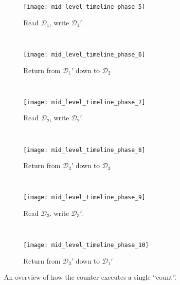 \documentclass[10pt]{article}
\begin{document}
\begin{figure}
    \centering

    \begin{subfigure}[t]{0.14\textwidth}
        \centering
        \texttt{[image: mid\_level\_timeline\_phase\_5]}
        \caption{\label{fig:mid_level_timeline_phase_5} Read ${\mathcal{D}_1}$, write ${\mathcal{D}_1}'$.}
    \end{subfigure} %
    ~
    \begin{subfigure}[t]{0.14\textwidth}
        \centering
        \texttt{[image: mid\_level\_timeline\_phase\_6]}
        \caption{\label{fig:mid_level_timeline_phase_6} Return from ${\mathcal{D}_1}'$ down to ${\mathcal{D}_2}$ }
    \end{subfigure}%
   ~
    \begin{subfigure}[t]{0.14\textwidth}
        \centering
        \texttt{[image: mid\_level\_timeline\_phase\_7]}
        \caption{\label{fig:mid_level_timeline_phase_7} Read ${\mathcal{D}_2}$, write ${\mathcal{D}_2}'$. }
    \end{subfigure}%
    ~
    \begin{subfigure}[t]{0.14\textwidth}
        \centering
        \texttt{[image: mid\_level\_timeline\_phase\_8]}
        \caption{\label{fig:mid_level_timeline_phase_8} Return from ${\mathcal{D}_2}'$ down to ${\mathcal{D}_3}$ }
    \end{subfigure}
    ~
    \begin{subfigure}[t]{0.14\textwidth}
        \centering
        \texttt{[image: mid\_level\_timeline\_phase\_9]}
        \caption{\label{fig:mid_level_timeline_phase_9} Read ${\mathcal{D}_3}$, write ${\mathcal{D}_3}'$. }
    \end{subfigure}
    ~
    \begin{subfigure}[t]{0.14\textwidth}
        \centering
        \texttt{[image: mid\_level\_timeline\_phase\_10]}
        \caption{\label{fig:mid_level_timeline_phase_10} Return from ${\mathcal{D}_3}'$ down to ${\mathcal{D}_1}'$ }
    \end{subfigure}


    \caption{\label{fig:mid_level_timeline_overview} An overview of how the counter executes a single ``count''.  }
\end{figure}
\end{document}
